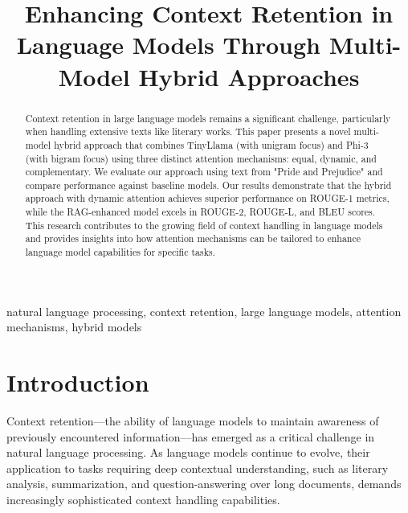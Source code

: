 \documentclass[conference]{IEEEtran}
\begin{document}
\title{Enhancing Context Retention in Language Models Through Multi-Model Hybrid Approaches\\
}

\author{
}

\maketitle

\begin{abstract}
Context retention in large language models remains a significant challenge, particularly when handling extensive texts like literary works. This paper presents a novel multi-model hybrid approach that combines TinyLlama (with unigram focus) and Phi-3 (with bigram focus) using three distinct attention mechanisms: equal, dynamic, and complementary. We evaluate our approach using text from "Pride and Prejudice" and compare performance against baseline models. Our results demonstrate that the hybrid approach with dynamic attention achieves superior performance on ROUGE-1 metrics, while the RAG-enhanced model excels in ROUGE-2, ROUGE-L, and BLEU scores. This research contributes to the growing field of context handling in language models and provides insights into how attention mechanisms can be tailored to enhance language model capabilities for specific tasks.
\end{abstract}

\begin{IEEEkeywords}
natural language processing, context retention, large language models, attention mechanisms, hybrid models
\end{IEEEkeywords}

\section{Introduction}
Context retention—the ability of language models to maintain awareness of previously encountered information—has emerged as a critical challenge in natural language processing. As language models continue to evolve, their application to tasks requiring deep contextual understanding, such as literary analysis, summarization, and question-answering over long documents, demands increasingly sophisticated context handling capabilities.
\end{document}

